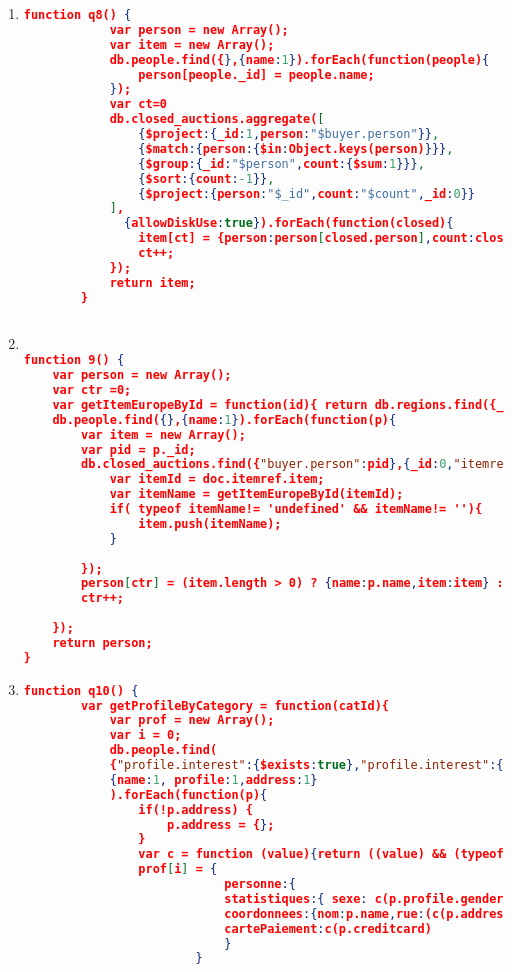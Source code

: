 \begin{enumerate}[label=Q\arabic*]
	
    \item \label{mongodb-q-8}%
	\begin{lstlisting}[language=JSON,   basicstyle=\scriptsize]
	   function q8() {
            var person = new Array();
            var item = new Array();
            db.people.find({},{name:1}).forEach(function(people){
        		person[people._id] = people.name;
        	});
            var ct=0
            db.closed_auctions.aggregate([
        		{$project:{_id:1,person:"$buyer.person"}},
        		{$match:{person:{$in:Object.keys(person)}}},
        		{$group:{_id:"$person",count:{$sum:1}}},
        		{$sort:{count:-1}},
        		{$project:{person:"$_id",count:"$count",_id:0}}
        	],
              {allowDiskUse:true}).forEach(function(closed){
                item[ct] = {person:person[closed.person],count:closed.count}
                ct++;  
            });
            return item;
        }
        
	\end{lstlisting}
	
    \item \label{mongodb-q-9}%
	\begin{lstlisting}[language=JSON,   basicstyle=\scriptsize]
	
function 9() {
    var person = new Array();
	var ctr =0;
	var getItemEuropeById = function(id){ return db.regions.find({_id:id, regions:"europe"},{_id:0,name:1}).name;};
	db.people.find({},{name:1}).forEach(function(p){
		var item = new Array();
		var pid = p._id;
		db.closed_auctions.find({"buyer.person":pid},{_id:0,"itemref.item":1}).forEach(function(doc){
			var itemId = doc.itemref.item;
			var itemName = getItemEuropeById(itemId);
			if( typeof itemName!= 'undefined' && itemName!= ''){
				item.push(itemName);
			}
			
		});
		person[ctr] = (item.length > 0) ? {name:p.name,item:item} : {name:p.name}; 
		ctr++;
		
	});	
	return person;
}

	\end{lstlisting}
	
	
    \item \label{mongodb-q-10}%
	\begin{lstlisting}[language=JSON,   basicstyle=\scriptsize]
	function q10() {
	    var getProfileByCategory = function(catId){
    		var prof = new Array();
    		var i = 0;
    		db.people.find(
    		{"profile.interest":{$exists:true},"profile.interest":{"$elemMatch": {category:catId}}},
    		{name:1, profile:1,address:1}
    		).forEach(function(p){
    			if(!p.address) {
    				p.address = {};
    			}
    			var c = function (value){return ((value) && (typeof value !== "undefined")) ? value : "";}; 
    			prof[i] = {
    						personne:{
    						statistiques:{ sexe: c(p.profile.gender), age:c(p.profile.gender),education:c(p.profile.education),revenu:c(p.profile.income)},
    						coordonnees:{nom:p.name,rue:(c(p.address) && c(p.address.street)),ville:c(p.address.city),pays:c(p.address.country),reseau:{courrier:c(p.emailaddress), pagePerso:c(p.homepage)}},
    						cartePaiement:c(p.creditcard)
    						} 
    					}
    			

\end{lstlisting}
\end{enumerate}
